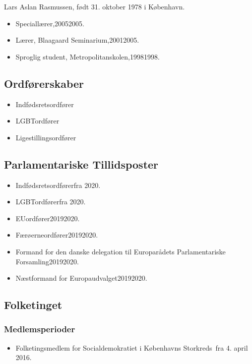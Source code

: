 \documentclass[11pt, a4paper]{awesome-cv}
\begin{document}
\makecvheader[R]
\makelettertitle
\begin{cvletter}
Lars Aslan Rasmussen, født 31. oktober 1978 i København.

\begin{itemize}
\item Speciallærer,20052005.
\item Lærer, Blaagaard Seminarium,20012005.
\item Sproglig student, Metropolitanskolen,19981998.
\end{itemize}
\subsection*{Ordførerskaber}
\begin{itemize}
\item Indfødsretsordfører
\item LGBTordfører
\item Ligestillingsordfører
\end{itemize}
\subsection*{Parlamentariske Tillidsposter}
\begin{itemize}
\item Indfødsretsordførerfra 2020.
\item LGBTordførerfra 2020.
\item EUordfører20192020.
\item Færøerneordfører20192020.
\item Formand for den danske delegation til Europarådets Parlamentariske Forsamling20192020.
\item Næstformand for Europaudvalget20192020.
\end{itemize}
\subsection*{Folketinget}
\subsubsection*{Medlemsperioder}
\begin{itemize}
\item Folketingsmedlem for Socialdemokratiet i Københavns Storkreds fra 4. april 2016.
\end{itemize}

\end{cvletter}
\end{document}
